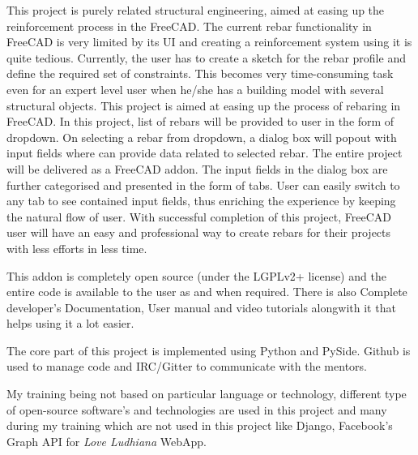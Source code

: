 This project is purely related structural engineering, aimed at easing up the reinforcement process in the FreeCAD. The current rebar functionality in FreeCAD is very limited by its UI and creating a reinforcement system using it is quite tedious. Currently, the user has to create a sketch for the rebar profile and define the required set of constraints. This becomes very time-consuming task even for an expert level user when he/she has a building model with several structural objects. This project is aimed at easing up the process of rebaring in FreeCAD. In this project, list of rebars will be provided to user in the form of dropdown. On selecting a rebar from dropdown, a dialog box will popout with input fields where can provide data related to selected rebar. The entire project will be delivered as a FreeCAD addon. The input fields in the dialog box are further categorised and presented in the form of tabs. User can easily switch to any tab to see contained input fields, thus enriching the experience by keeping the natural flow of user. With successful completion of this project, FreeCAD user will have an easy and professional way to create rebars for their projects with less efforts in less time.

This addon is completely open source (under the LGPLv2+ license) and the entire code is available to the user as and when
required. There is also Complete developer’s Documentation, User manual and video tutorials alongwith it that helps using it a lot easier.

The core part of this project is implemented using Python and PySide. Github is used to manage code and IRC/Gitter to communicate with the mentors.

My training being not based on particular language or technology, different type of open-source software's and technologies are
used in this project and many during my training which are not used in this
project like Django, Facebook's Graph API for\emph{ Love Ludhiana} WebApp.
